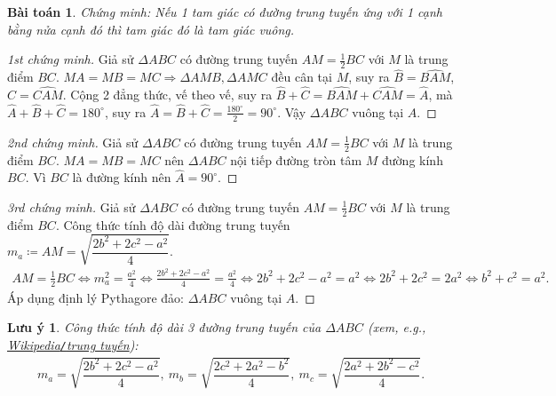 \documentclass{article}
\newtheorem{baitoan}{Bài toán}
\newtheorem{luuy}{Lưu ý}
\begin{document}
\begin{baitoan}
	Chứng minh: Nếu 1 tam giác có đường trung tuyến ứng với 1 cạnh bằng nửa cạnh đó thì tam giác đó là tam giác vuông.
\end{baitoan}

\begin{proof}[1st chứng minh]
	Giả sử $\Delta ABC$ có đường trung tuyến $AM = \frac{1}{2}BC$ với $M$ là trung điểm $BC$. $MA = MB = MC\Rightarrow\Delta AMB,\Delta AMC$ đều cân tại $M$, suy ra $\widehat{B} = \widehat{BAM}$, $\widehat{C} = \widehat{CAM}$. Cộng 2 đẳng thức, vế theo vế, suy ra $\widehat{B} + \widehat{C} = \widehat{BAM} + \widehat{CAM} = \widehat{A}$, mà $\widehat{A} + \widehat{B} + \widehat{C} = 180^\circ$, suy ra $\widehat{A} = \widehat{B} + \widehat{C} = \frac{180^\circ}{2} = 90^\circ$. Vậy $\Delta ABC$ vuông tại $A$.
\end{proof}

\begin{proof}[2nd chứng minh]
	Giả sử $\Delta ABC$ có đường trung tuyến $AM = \frac{1}{2}BC$ với $M$ là trung điểm $BC$. $MA = MB = MC$ nên $\Delta ABC$ nội tiếp đường tròn tâm $M$ đường kính $BC$. Vì $BC$ là đường kính nên $\widehat{A} = 90^\circ$.
\end{proof}

\begin{proof}[3rd chứng minh]
	Giả sử $\Delta ABC$ có đường trung tuyến $AM = \frac{1}{2}BC$ với $M$ là trung điểm $BC$. Công thức tính độ dài đường trung tuyến $m_a\coloneqq AM = \sqrt{\dfrac{2b^2 + 2c^2 - a^2}{4}}$.
	\begin{align*}
		AM = \frac{1}{2}BC\Leftrightarrow m_a^2 = \frac{a^2}{4}\Leftrightarrow\frac{2b^2 + 2c^2 - a^2}{4} = \frac{a^2}{4}\Leftrightarrow2b^2 + 2c^2 - a^2 = a^2\Leftrightarrow2b^2 + 2c^2 = 2a^2\Leftrightarrow b^2 + c^2 = a^2.
	\end{align*}
	Áp dụng định lý Pythagore đảo: $\Delta ABC$ vuông tại $A$.
\end{proof}

\begin{luuy}
	Công thức tính độ dài 3 đường trung tuyến của $\Delta ABC$ (xem, e.g., \href{https://vi.wikipedia.org/wiki/Trung_tuy%E1%BA%BFn}{Wikipedia{\rm\texttt{/}}trung tuyến}):
	\begin{align*}
		m_a = \sqrt{\dfrac{2b^2 + 2c^2 - a^2}{4}},\ m_b = \sqrt{\dfrac{2c^2 + 2a^2 - b^2}{4}},\ m_c = \sqrt{\dfrac{2a^2 + 2b^2 - c^2}{4}}.
	\end{align*}
\end{luuy}
\end{document}

